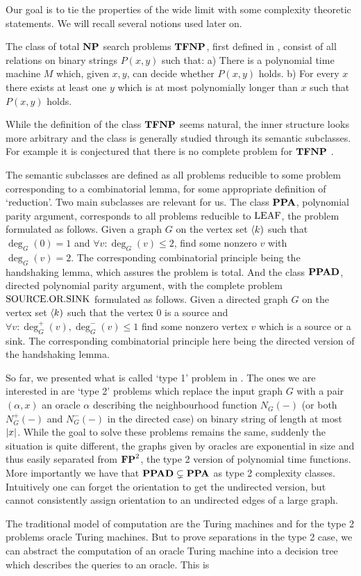 Our goal is to tie the properties of the wide limit with some complexity theoretic statements. We will recall several notions used later on.

The class of total $\textbf{NP}$ search problems $\textbf{TFNP}$, first defined in \cite{megiddo1991total}, consist of all relations on binary strings $P(x,y)$ such that: a) There is a polynomial time machine $M$ which, given $x,y$, can decide whether $P(x,y)$ holds. b) For every $x$ there exists at least one $y$ which is at most polynomially longer than $x$ such that $P(x,y)$ holds.

While the definition of the class $\textbf{TFNP}$ seems natural, the inner structure looks more arbitrary and the class is generally studied through its semantic subclasses. For example it is conjectured that there is no complete problem for $\textbf{TFNP}$ \cite{goldberg2018tfnp}.

The semantic subclasses are defined as all problems reducible to some problem corresponding to a combinatorial lemma, for some appropriate definition of `reduction'. Two main subclasses are relevant for us. The class $\textbf{PPA}$, polynomial parity argument, corresponds to all problems reducible to $\text{LEAF}$, the problem formulated as follows. Given a graph $G$ on the vertex set $\langle k)$ such that $\deg_G(0)=1$ and $\forall v: \deg_G(v)\leq 2$, find some nonzero $v$ with $\deg_G(v)=2$. The corresponding combinatorial principle being the handshaking lemma, which assures the problem is total. And the class $\textbf{PPAD}$, directed polynomial parity argument, with the complete problem $\text{SOURCE.OR.SINK}$ formulated as follows. Given a directed graph $G$ on the vertex set $\langle k)$ such that the vertex $0$ is a source and $\forall v: \deg_G^+(v),\deg_G^-(v)\leq 1$ find some nonzero vertex $v$ which is a source or a sink. The corresponding combinatorial principle here being the directed version of the handshaking lemma.

So far, we presented what is called `type 1' problem in \cite{beame1995rel}. The ones we are interested in are `type 2' problems which replace the input graph $G$ with a pair $(\alpha,x)$ an oracle $\alpha$ describing the neighbourhood function $N_G(-)$ (or both $N_G^+(-)$ and $N_G^-(-)$ in the directed case) on binary string of length at most $\left|{x}\right|$. While the goal to solve these problems remains the same, suddenly the situation is quite different, the graphs given by oracles are exponential in size and thus easily separated from $\textbf{FP}^2$, the type 2 version of polynomial time functions. More importantly we have that $\textbf{PPAD}\subsetneq \textbf{PPA}$ as type 2 complexity classes. Intuitively one can forget the orientation to get the undirected version, but cannot consistently assign orientation to an undirected edges of a large graph.

The traditional model of computation are the Turing machines and for the type 2 problems oracle Turing machines. But to prove separations in the type 2 case, we can abstract the computation of an oracle Turing machine into a decision tree which describes the queries to an oracle. This is
